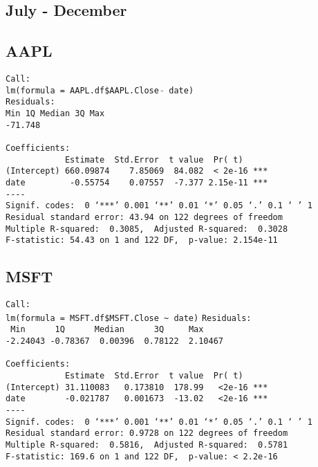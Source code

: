\documentclass{article}[14pt]
\begin{document}
\subsection{July - December}
\subsection{AAPL}
\texttt{Call: \\
lm(formula = AAPL.df\$AAPL.Close $\tilde{}$ date)\\
Residuals:\\
Min \hspace{35pt} 1Q \qquad Median \qquad 3Q \qquad  Max\\
-71.748        \\}
\verb| |\\
\verb|Coefficients:|\\
\verb|            Estimate  Std.Error  t value  Pr( t)|\\
\verb|(Intercept) 660.09874    7.85069  84.082  < 2e-16 ***|\\
\verb|date         -0.55754    0.07557  -7.377 2.15e-11 ***|\\
\verb|----|\\
\verb|Signif. codes:  0 ‘***’ 0.001 ‘**’ 0.01 ‘*’ 0.05 ‘.’ 0.1 ‘ ’ 1|\\
\verb|Residual standard error: 43.94 on 122 degrees of freedom|\\
\verb|Multiple R-squared:  0.3085,	Adjusted R-squared:  0.3028 |\\
\verb|F-statistic: 54.43 on 1 and 122 DF,  p-value: 2.154e-11|

\subsection{MSFT}
\verb|Call:|\\
\verb|lm(formula = MSFT.df$MSFT.Close ~ date)|
\verb|Residuals:|\\
\verb| Min      1Q      Median      3Q     Max |\\
\verb|-2.24043 -0.78367  0.00396  0.78122  2.10467 |\\
\verb| |\\
\verb|Coefficients:|\\
\verb|            Estimate  Std.Error  t value  Pr( t)|\\
\verb|(Intercept) 31.110083   0.173810  178.99   <2e-16 ***|\\
\verb|date        -0.021787   0.001673  -13.02   <2e-16 ***|\\
\verb|----|\\
\verb|Signif. codes:  0 ‘***’ 0.001 ‘**’ 0.01 ‘*’ 0.05 ‘.’ 0.1 ‘ ’ 1|\\
\verb|Residual standard error: 0.9728 on 122 degrees of freedom|\\
\verb|Multiple R-squared:  0.5816,	Adjusted R-squared:  0.5781|\\
\verb|F-statistic: 169.6 on 1 and 122 DF,  p-value: < 2.2e-16|
\end{document}
